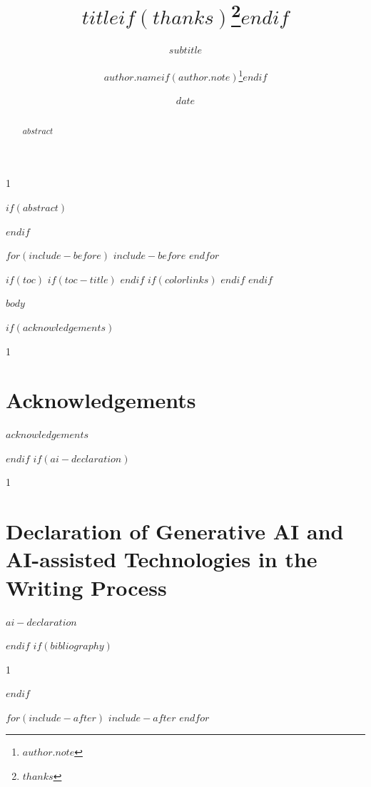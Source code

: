 \documentclass[$if(fontsize)$$fontsize$$endif$, a4paper]{article}
\title{$title$$if(thanks)$\thanks{$thanks$}$endif$}
\subtitle{$subtitle$}
\author[$if(author.affil-id)$$author.affil-id$$endif$]{%
  $author.name$$if(author.note)$\thanks{$author.note$}$endif$
}
\author{}
\affil[$affiliations.id$]{$affiliations.name$}
\date{$date$}
\begin{document}
\begin{spacing}{1}
  \maketitle
  $if(abstract)$
  \clearpage
  \begin{abstract}
  $abstract$
  \end{abstract}
  $endif$
\end{spacing}

$for(include-before)$
$include-before$
$endfor$

$if(toc)$
$if(toc-title)$
\renewcommand*\contentsname{$toc-title$}
$endif$
{
$if(colorlinks)$
\hypersetup{linkcolor=$if(toccolor)$$toccolor$$else$$endif$}
$endif$
\setcounter{tocdepth}{$toc-depth$}
\tableofcontents
}
$endif$

\setcounter{footnote}{0}

$body$

$if(acknowledgements)$
\begin{spacing}{1}
  \section*{Acknowledgements}
  $acknowledgements$
\end{spacing}
$endif$
$if(ai-declaration)$
\begin{spacing}{1}
  \section*{Declaration of Generative AI and AI-assisted Technologies in the Writing Process}
  $ai-declaration$
\end{spacing}
$endif$
$if(bibliography)$
\begin{spacing}{1}
  
\end{spacing}
$endif$

$for(include-after)$
$include-after$
$endfor$
\end{document}
